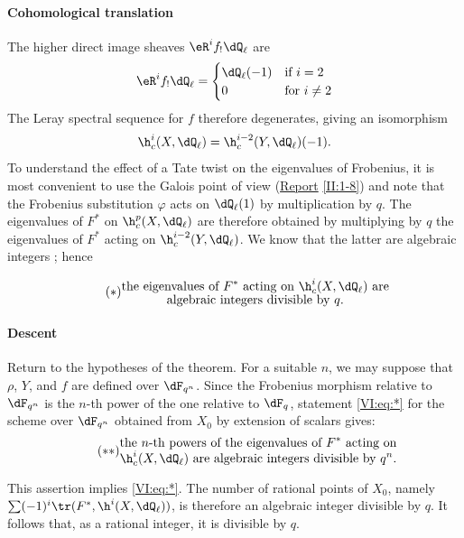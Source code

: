 \paragraph{Cohomological translation}
The higher direct image sheaves $\eR^i f_!\dQ_\ell$ are 
\[
  \eR^i f_!\dQ_\ell = \begin{cases}
                       \dQ_\ell(-1) & \text{if $i = 2$} \\
                       0            & \text{for $i\ne 2$}
                     \end{cases}
\]
The Leray spectral sequence for $f$ therefore degenerates, giving an isomorphism 
\[
  \h_c^i(X,\dQ_\ell) = \h_c^{i-2}(Y,\dQ_\ell)(-1) \text{.}
\]
To understand the effect of a Tate twist on the eigenvalues of 
Frobenius, it is most convenient to use the Galois point of view 
(\hyperref[II]{Report} \ref{II:1-8}) and note that the Frobenius substitution 
$\varphi$ acts on $\dQ_\ell(1)$ by multiplication by $q$. The 
eigenvalues of $F^\ast$ on $\h_c^p(X,\dQ_\ell)$ are therefore obtained by 
multiplying by $q$ the eigenvalues of $F^\ast$ acting on $\h_c^{i-2}(Y,\dQ_\ell)$. We 
know that the latter are algebraic integers \cite[XXI 5.2.2]{sga7}; hence 

\begin{equation*}\tag{$*$}\label{VI:eq:*}
  \substack{\displaystyle\text{the eigenvalues of $F^\ast$ acting on $\h_c^i(X,\dQ_\ell)$ are} \\
  \displaystyle\text{algebraic integers divisible by $q$.}}
\end{equation*}


\paragraph{Descent}
Return to the hypotheses of the theorem. For a suitable $n$, we may 
suppose that $\rho$, $Y$, and $f$ are defined over $\dF_{q^n}$. Since the 
Frobenius morphism relative to $\dF_{q^n}$ is the $n$-th power of the one 
relative to $\dF_q$, statement \eqref{VI:eq:*} for the scheme over 
$\dF_{q^n}$ obtained from $X_0$ by extension of scalars gives: 
\begin{equation*}\tag{$**$}\label{VI:eq:**}
  \substack{\displaystyle\text{the $n$-th powers of the eigenvalues of $F^\ast$ acting on} \\ \displaystyle\text{$\h_c^i(X,\dQ_\ell)$ are algebraic integers divisible by $q^n$.}}
\end{equation*}

This assertion implies \eqref{VI:eq:*}. The number of rational points of 
$X_0$, namely $\sum (-1)^i \tr(F^\ast,\h^i(X,\dQ_\ell))$, is therefore an 
algebraic integer divisible by $q$. It follows that, as a rational integer, 
it is divisible by $q$. 





